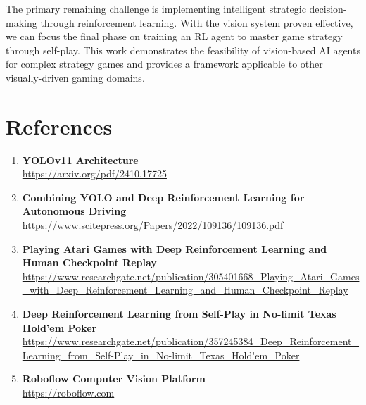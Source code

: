 \documentclass[12pt]{article}
\begin{document}
The primary remaining challenge is implementing intelligent strategic decision-making through reinforcement learning. With the vision system proven effective, we can focus the final phase on training an RL agent to master game strategy through self-play. This work demonstrates the feasibility of vision-based AI agents for complex strategy games and provides a framework applicable to other visually-driven gaming domains.

\section{References}

\begin{enumerate}
    \item \textbf{YOLOv11 Architecture} \\
    \url{https://arxiv.org/pdf/2410.17725}

    \item \textbf{Combining YOLO and Deep Reinforcement Learning for Autonomous Driving} \\
    \url{https://www.scitepress.org/Papers/2022/109136/109136.pdf}

    \item \textbf{Playing Atari Games with Deep Reinforcement Learning and Human Checkpoint Replay} \\
    \url{https://www.researchgate.net/publication/305401668_Playing_Atari_Games_with_Deep_Reinforcement_Learning_and_Human_Checkpoint_Replay}

    \item \textbf{Deep Reinforcement Learning from Self-Play in No-limit Texas Hold'em Poker} \\
    \url{https://www.researchgate.net/publication/357245384_Deep_Reinforcement_Learning_from_Self-Play_in_No-limit_Texas_Hold'em_Poker}

    \item \textbf{Roboflow Computer Vision Platform} \\
    \url{https://roboflow.com}
\end{enumerate}
\end{document}

